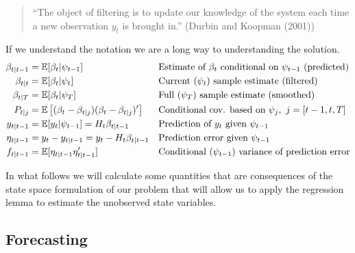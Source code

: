 \documentclass[
  letterpaper,
]{book}
\begin{document}
\begin{quote}
``The object of filtering is to update our knowledge of the system each
time a new observation \(y_t\) is brought in.'' (Durbin and Koopman
(2001))
\end{quote}

\begin{tcolorbox}[enhanced jigsaw, breakable, left=2mm, arc=.35mm, toptitle=1mm, colbacktitle=quarto-callout-note-color!10!white, opacityback=0, bottomrule=.15mm, leftrule=.75mm, opacitybacktitle=0.6, title=\textcolor{quarto-callout-note-color}{\faInfo}\hspace{0.5em}{Notation}, colframe=quarto-callout-note-color-frame, coltitle=black, titlerule=0mm, toprule=.15mm, bottomtitle=1mm, rightrule=.15mm, colback=white]

If we understand the notation we are a long way to understanding the
solution. \[
\begin{align}
\beta_{t|t-1} &= \mathbb{E}[\beta_t | \psi_{t-1}] && \hbox{Estimate of } \beta_t \hbox{ conditional on } \psi_{t-1} \hbox{ (predicted)} \\ 
\beta_{t|t}   &= \mathbb{E}[\beta_t | \psi_t]     && \hbox{Current } (\psi_t) \hbox{ sample estimate} \hbox{ (filtered)}\\ 
\beta_{t|T}   &= \mathbb{E}[\beta_t | \psi_T]     && \hbox{Full } (\psi_T) \hbox{ sample estimate} \hbox{ (smoothed)}\\ 
P_{t|j}       &= \mathbb{E}\left[(\beta_t - \beta_{t|j}) (\beta_t - \beta _{t|j})'\right]  && \hbox{Conditional cov. based on } \psi_j,\ j=[t-1,t,T]\\ 
y_{t|t-1}     &= \mathbb{E}[y_t | \psi_{t-1}] = H_t \beta_{t|t-1}  && \hbox{Prediction of}\ y_t \hbox{ given } \psi_{t-1}\\ 
\eta_{t|t-1}  &= y_t - y_{t|t-1} = y_t - H_t \beta_{t|t-1}  && \hbox{Prediction error given }\psi_{t-1} \\ 
f_{t|t-1}     &= \mathbb{E}[\eta_{t|t-1}\eta_{t|t-1}']      && \hbox{Conditional } (\psi_{t-1}) \hbox{ variance of prediction error}
\end{align}
\]

\end{tcolorbox}

In what follows we will calculate some quantities that are consequences
of the state space formulation of our problem that will allow us to
apply the regression lemma to estimate the unobserved state variables.

\hypertarget{forecasting}{%
\subsection{Forecasting}\label{forecasting}}
\end{document}
